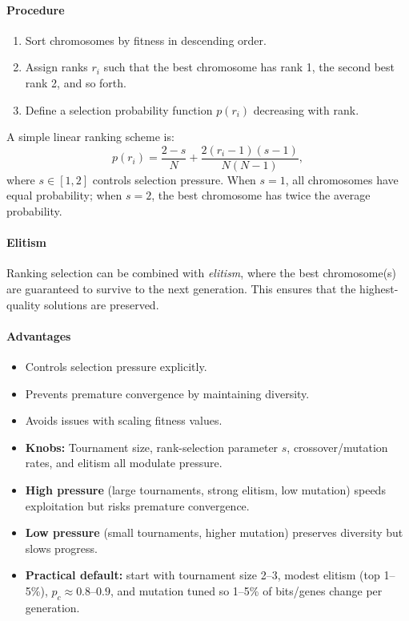 \paragraph{Procedure}

\begin{enumerate}
    \item Sort chromosomes by fitness in descending order.
    \item Assign ranks $r_i$ such that the best chromosome has rank 1, the second best rank 2, and so forth.
    \item Define a selection probability function $p(r_i)$ decreasing with rank.
\end{enumerate}

A simple linear ranking scheme is:
\begin{equation}
    p(r_i) = \frac{2 - s}{N} + \frac{2(r_i - 1)(s - 1)}{N(N - 1)},
    \label{eq:linear_ranking}
\end{equation}
where $s \in [1,2]$ controls selection pressure. When $s=1$, all chromosomes have equal probability; when $s=2$, the best chromosome has twice the average probability.

\paragraph{Elitism}

Ranking selection can be combined with \emph{elitism}, where the best chromosome(s) are guaranteed to survive to the next generation. This ensures that the highest-quality solutions are preserved.

\paragraph{Advantages}

\begin{itemize}
    \item Controls selection pressure explicitly.
    \item Prevents premature convergence by maintaining diversity.
    \item Avoids issues with scaling fitness values.
\end{itemize}

\begin{tcolorbox}[summarybox, title={Selection pressure and exploration/exploitation}]
\begin{itemize}
    \item \textbf{Knobs:} Tournament size, rank-selection parameter $s$, crossover/mutation rates, and elitism all modulate pressure.
    \item \textbf{High pressure} (large tournaments, strong elitism, low mutation) speeds exploitation but risks premature convergence.
    \item \textbf{Low pressure} (small tournaments, higher mutation) preserves diversity but slows progress.
    \item \textbf{Practical default:} start with tournament size 2--3, modest elitism (top 1--5\%), \(p_c \approx 0.8\text{--}0.9\), and mutation tuned so 1--5\% of bits/genes change per generation.
\end{itemize}
\end{tcolorbox}

